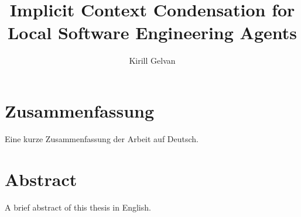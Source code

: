\documentclass[%
thesis=student,%
coverpage=false,%
titlepage=false,%
headmarks=true, %
english,%
font=libertine, %
math=newpxtx, %
BCOR=5mm,%
coverBCOR=11mm%
]{tumbook}
\title{Implicit Context Condensation for Local Software Engineering Agents}
\author{Kirill Gelvan}
\begin{document}
\frontmatter
\maketitle

\section*{Zusammenfassung}
Eine kurze Zusammenfassung der Arbeit auf Deutsch.


\section*{Abstract}
A brief abstract of this thesis in English.


\cleardoublepage{}

\tableofcontents


\mainmatter{}











\backmatter{}
\listoffigures%
\listoftables%

\nocite{*} %
\printbibliography{} %
\end{document}

